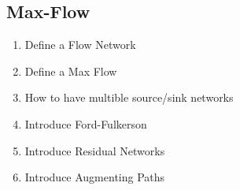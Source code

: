 \subsection{Max-Flow}
\begin{enumerate}
  \item Define a Flow Network
  \item Define a Max Flow
  \item How to have multible source/sink networks
  \item Introduce Ford-Fulkerson
  \item Introduce Residual Networks
  \item Introduce Augmenting Paths
\end{enumerate}